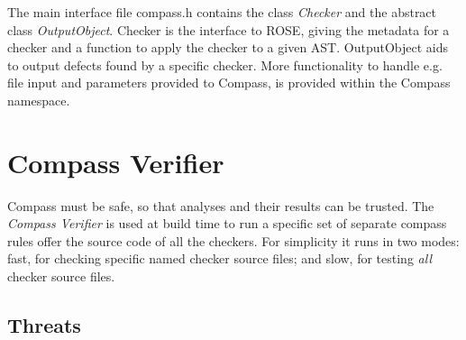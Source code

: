 The main interface file compass.h contains the class \emph{Checker} and the
abstract class \emph{OutputObject}. Checker is the interface to ROSE,
giving the metadata for a checker and a function to apply the checker to a
given AST.
OutputObject aids
to output defects found by a specific checker. More functionality to handle e.g. file
input and parameters provided to Compass, is provided within the Compass namespace.

\section{Compass Verifier}

Compass must be safe, so that analyses and their results can be trusted. 
The {\em Compass Verifier} is used at build time to run a specific set of separate 
compass rules offer the source code of all the checkers.  For simplicity it runs in two
modes: fast, for checking specific named checker source files; and slow, for testing 
{\em all} checker source files.

\subsection{Threats} 

